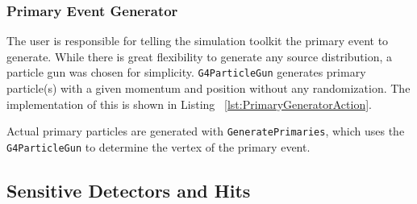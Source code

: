 \subsubsection{Primary Event Generator}

The user is responsible for telling the simulation toolkit the primary event to generate.
While there is great flexibility to generate any source distribution, a particle gun was chosen for simplicity.
\verb+G4ParticleGun+ generates primary particle(s) with a given momentum and position without any randomization.
The implementation of this is shown in Listing ~\ref{lst:PrimaryGeneratorAction}.

Actual primary particles are generated with \verb+GeneratePrimaries+, which uses the \verb+G4ParticleGun+ to determine the vertex of the primary event.


\subsection{Sensitive Detectors and Hits}


